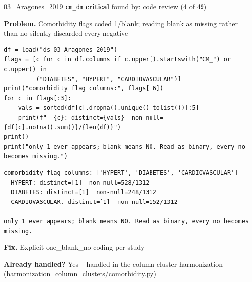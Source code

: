 \documentclass[9pt, t, handout]{beamer}
\newcommand{\ans}[1]{\textcolor{structure.fg}{#1}}
\begin{document}
\begin{frame}[fragile]{03\_Aragones\_2019 \quad \texttt{cm\_dm}}
  {\scriptsize\textcolor{red!70!black}{\textbf{critical}} \quad
   found by: code review \quad (4 of 49)}
  \vspace{3pt}

  {\footnotesize \textbf{Problem.} Comorbidity flags coded 1/blank; reading blank as missing rather than no silently discarded every negative}
  \vspace{4pt}

  \begin{Verbatim}[fontsize=\tiny, frame=single, framesep=2pt, label=\tiny reproduce]
df = load("ds_03_Aragones_2019")
flags = [c for c in df.columns if c.upper().startswith("CM_") or c.upper() in
         ("DIABETES", "HYPERT", "CARDIOVASCULAR")]
print("comorbidity flag columns:", flags[:6])
for c in flags[:3]:
    vals = sorted(df[c].dropna().unique().tolist())[:5]
    print(f"  {c}: distinct={vals}  non-null={df[c].notna().sum()}/{len(df)}")
print()
print("only 1 ever appears; blank means NO. Read as binary, every no becomes missing.")
  \end{Verbatim}
  \begin{Verbatim}[fontsize=\tiny, frame=single, framesep=2pt, label=\tiny output]
comorbidity flag columns: ['HYPERT', 'DIABETES', 'CARDIOVASCULAR']
  HYPERT: distinct=[1]  non-null=528/1312
  DIABETES: distinct=[1]  non-null=248/1312
  CARDIOVASCULAR: distinct=[1]  non-null=152/1312

only 1 ever appears; blank means NO. Read as binary, every no becomes missing.
  \end{Verbatim}
  \vspace{2pt}

  {\footnotesize \textbf{Fix.} Explicit one\_blank\_no coding per study}
  \vspace{2pt}

  {\footnotesize \textbf{Already handled?} \ans{Yes} -- handled in the column-cluster harmonization
   (harmonization\_column\_clusters/comorbidity.py)}
\end{frame}
\end{document}
